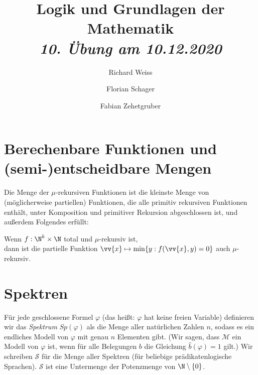 \documentclass{article}
\title
{
  Logik und Grundlagen der Mathematik \\
  \vspace{4pt}
  \normalsize
  \textit{10. Übung am 10.12.2020}
}
\author
{
  Richard Weiss
  \and
  Florian Schager
  \and
  Fabian Zehetgruber
}
\date{}
\begin{document}
\maketitle

\section*{Berechenbare Funktionen und (semi-)entscheidbare Mengen}

Die Menge der $\mu$-rekursiven Funktionen ist die kleinste Menge von (möglicherweise partiellen)
Funktionen, die alle primitiv rekursiven Funktionen enthält, unter Komposition und
primitiver Rekursion abgeschlossen ist, und außerdem Folgendes erfüllt:

\begin{adjustwidth}{1cm}{}
Wenn $f: \N^k \times \N$ total und $\mu$-rekursiv ist, \\
dann ist die partielle Funktion $\vv{x} \mapsto \min\{y: f(\vv{x},y) = 0\}$ auch
$\mu$-rekursiv.
\end{adjustwidth}


\pagebreak





\section*{Spektren}
Für jede geschlossene Formel $\varphi$ (das heißt: $\varphi$ hat keine freien Variable)
definieren wir das \textit{Spektrum} $Sp(\varphi)$ als die Menge aller natürlichen Zahlen $n$,
sodass es ein endliches Modell von $\varphi$ mit genau $n$ Elementen gibt. \newline
(Wir sagen, dass $\mathcal{M}$ ein Modell von $\varphi$ ist, wenn für alle Belegungen $
b$ die Gleichung $\hat{b}(\varphi) = 1$ gilt.) \newline
\newline
Wir schreiben $\mathscr{S}$ für die Menge aller Spektren (für beliebige prädikatenlogische Sprachen).
$\mathscr{S}$ ist eine Untermenge der Potenzmenge von $\N \setminus \{0\}$.




\end{document}
